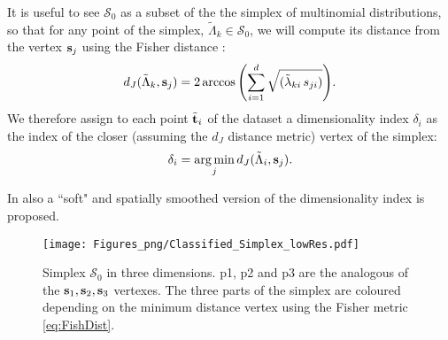 It is useful to see $\mathcal{S}_0$ as a subset of the the simplex of multinomial distributions, so that for any point of the simplex, $\tilde{\Lambda}_k \in \mathcal{S_0}$,
we will compute its distance from the vertex $\boldsymbol{\mathbf{s}}_j$ using the Fisher distance \citep{Lebanon:2005:RGS:1087529}:
\begin{equation}
	\label{eq:FishDist}
	d_J(\tilde{\Lambda}_k,\boldsymbol{\mathbf{s}}_j) = 2\arccos{\left(\sum_{i=1}^{d} \sqrt{(\tilde{\lambda}_{ki}\, s_{ji})}\right)}.
\end{equation}
We therefore assign to each point $\tilde{\boldsymbol{\mathbf{t}}}_i$ of the dataset a
dimensionality index $\delta_i$ as the index of the closer (assuming the $d_J$ distance metric) vertex of the simplex:
\begin{equation}\label{eq:idxHard}
	\delta_i = \operatorname*{arg\,min}_j d_J(\tilde{\Lambda}_i,\boldsymbol{\mathbf{s}}_j).
\end{equation}

In \citet{Canducci2021} also a ``soft" and spatially smoothed version of the dimensionality index is proposed.

\begin{figure}[ht!]
  \texttt{[image: Figures\_png/Classified\_Simplex\_lowRes.pdf]}
  \caption{Simplex $\mathcal{S}_0$ in three dimensions. p1, p2 and p3 are the analogous of the $\boldsymbol{\mathbf{s}}_1, \boldsymbol{\mathbf{s}}_2, \boldsymbol{\mathbf{s}}_3$ vertexes. The three parts of the simplex are coloured depending on the minimum distance vertex using the Fisher metric \eqref{eq:FishDist}.}
  \label{fig:simplex}
\end{figure}


